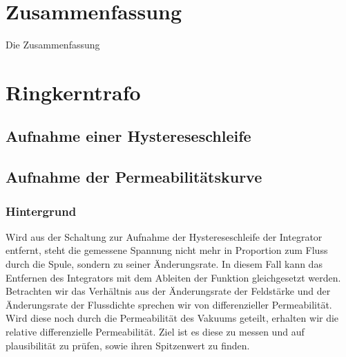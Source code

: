 \documentclass[a4paper,twoside,12pt,DIV=13,BCOR=5mm,numbers=noenddot,cleardoublepage=empty]{scrbook}
\begin{document}

\cleardoublepage
\setcounter{tocdepth}{3}

\setcounter{page}{0}
\renewcommand{\thepage}{\roman{page}}
\tableofcontents \cleardoublepage

\setcounter{page}{1}
\renewcommand{\thepage}{\arabic{page}}
\setcounter{chapter}{0}



\newpage
\chapter{Zusammenfassung}
Die Zusammenfassung
\chapter{Ringkerntrafo}
\section{Aufnahme einer Hystereseschleife}

\section{Aufnahme der Permeabilit\"atskurve}
\subsection{Hintergrund}
Wird aus der Schaltung zur Aufnahme der Hystereseschleife der Integrator entfernt, steht die gemessene Spannung nicht mehr in Proportion 
zum Fluss durch die Spule, sondern zu seiner \"Anderungsrate. In diesem Fall kann das Entfernen des Integrators mit dem Ableiten der Funktion
gleichgesetzt werden. Betrachten wir das Verh\"altnis aus der \"Anderungsrate der Feldst\"arke und der \"Anderungsrate der Flussdichte sprechen wir von 
differenzieller Permeabilit\"at. Wird diese noch durch die Permeabilit\"at des Vakuums geteilt, erhalten wir die relative differenzielle Permeabilit\"at. Ziel ist es diese zu messen 
und auf plausibilit\"at zu pr\"ufen, sowie ihren Spitzenwert zu finden.
\end{document}
